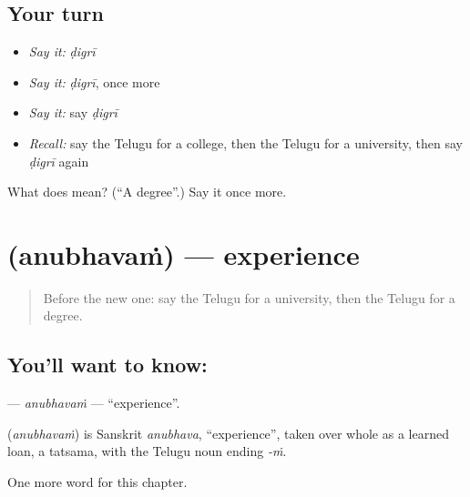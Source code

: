 \subsection*{Your turn}
\begin{itemize}
\raggedright
  \item \emph{Say it:} \emph{ḍigrī}
  \item \emph{Say it:} \emph{ḍigrī}, once more
  \item \emph{Say it:} say \emph{ḍigrī}
  \item \emph{Recall:} say the Telugu for a college, then the Telugu for a university, then say \emph{ḍigrī} again
\end{itemize}

\begin{tcolorbox}[breakable,colback=teal!4,colframe=teal!35!black,title={Before you move on}]
What does  mean? (\textquotedblleft{}A degree\textquotedblright{}.) Say it once more.
\end{tcolorbox}
\section[\texorpdfstring{\te{అనుభవం} (anubhavaṁ)}{అనుభవం (anubhavaṁ)}]{ (anubhavaṁ) — experience}

\label{lesson:TE-C311-anubhavam}



\begin{quote}
Before the new one: say the Telugu for a university, then the Telugu for a degree.
\end{quote}

\subsection*{You'll want to know: }
\textbf{} — \emph{anubhavaṁ} — \textquotedblleft{}experience\textquotedblright{}.

\begin{cousinweb}
\textbf{} (\emph{anubhavaṁ}) is Sanskrit \emph{anubhava}, \textquotedblleft{}experience\textquotedblright{}, taken over whole as a learned loan, a tatsama, with the Telugu noun ending \emph{-ṁ}.
\end{cousinweb}

\begin{grammarlens}[title={What you've built}]
One more word for this chapter.
\end{grammarlens}

